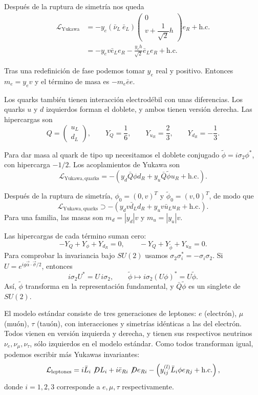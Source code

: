 \documentclass[11pt,a4paper]{article}
\newcommand{\hc}{\mathrm{h.c.}}
\begin{document}
Después de la ruptura de simetría nos queda
\begin{align*}
  \mathcal L_{\mathrm{Yukawa}}
  &=-y_e(\bar\nu_L\ \bar e_L)
    \begin{pmatrix}0\\v+\dfrac1{\sqrt2}h\end{pmatrix}e_R
    +\text{h.c.}\\
  &=-y_ev\bar e_Le_R-\frac{y_eh}{\sqrt2}\bar e_Le_R+\text{h.c.}
\end{align*}

Tras una redefinición de fase podemos tomar $y_e$ real y positivo.
Entonces $m_e=y_ev$ y el término de masa es $-m_e\bar e e$.

Los quarks también tienen interacción electrodébil con unas diferencias. Los
quarks $u$ y $d$ izquierdos forman el doblete, y ambos tienen versión derecha.
Las hipercargas son
\[
  Q=\begin{pmatrix}u_L\\d_L\end{pmatrix},
  \qquad
  Y_Q=\frac16,
  \qquad
  Y_{u_R}=\frac23,
  \qquad
  Y_{d_R}=-\frac13.
\]

Para dar masa al quark de tipo up necesitamos el doblete conjugado
$\widetilde\phi=i\sigma_2\phi^*$, con hipercarga $-1/2$.
Los acoplamientos de Yukawa son
\[
  \mathcal L_{\mathrm{Yukawa,quarks}}
  =-\left(y_d\bar Q\phi d_R+y_u\bar Q\widetilde\phi u_R+\hc\right).
\]

Después de la ruptura de simetría,
$\phi_0=(0,v)^T$ y $\widetilde\phi_0=(v,0)^T$, de modo que
\[
  \mathcal L_{\mathrm{Yukawa,quarks}}
  \supset-\left(y_dv\bar d_Ld_R+y_uv\bar u_Lu_R+\hc\right).
\]
Para una familia, las masas son $m_d=|y_d|v$ y $m_u=|y_u|v$.

Las hipercargas de cada término suman cero:
\[
  -Y_Q+Y_\phi+Y_{d_R}=0,\qquad
  -Y_Q+Y_{\widetilde\phi}+Y_{u_R}=0.
\]
Para comprobar la invariancia bajo $SU(2)$ usamos
$\sigma_2\sigma_i^*=-\sigma_i\sigma_2$. Si
$U=e^{ig\vec\alpha\cdot\vec\sigma/2}$, entonces
\[
  i\sigma_2U^*=U\,i\sigma_2,
  \qquad
  \widetilde\phi\longmapsto
  i\sigma_2(U\phi)^*=U\widetilde\phi.
\]
Así, $\widetilde\phi$ transforma en la representación fundamental,
y $\bar Q\widetilde\phi$ es un singlete de $SU(2)$.

El modelo estándar consiste de tres generaciones de leptones: $e$ (electrón),
$\mu$ (muón), $\tau$ (tauón), con interacciones y simetrías idénticas a las del
electrón. Todos vienen en versión izquierda y derecha, y tienen sus respectivos
neutrinos $\nu_e,\nu_\mu,\nu_\tau$, sólo izquierdos en el modelo estándar. Como
todos transforman igual, podemos escribir más Yukawas invariantes:
\[
  \mathcal L_{\mathrm{leptones}}
  =i\bar L_i\not\!D L_i+i\bar e_{Ri}\not\!D e_{Ri}
   -\left(y_{ij}^{(l)}\bar L_i\phi e_{Rj}+\hc\right),
\]
donde $i=1,2,3$ corresponde a $e,\mu,\tau$ respectivamente.
\end{document}
